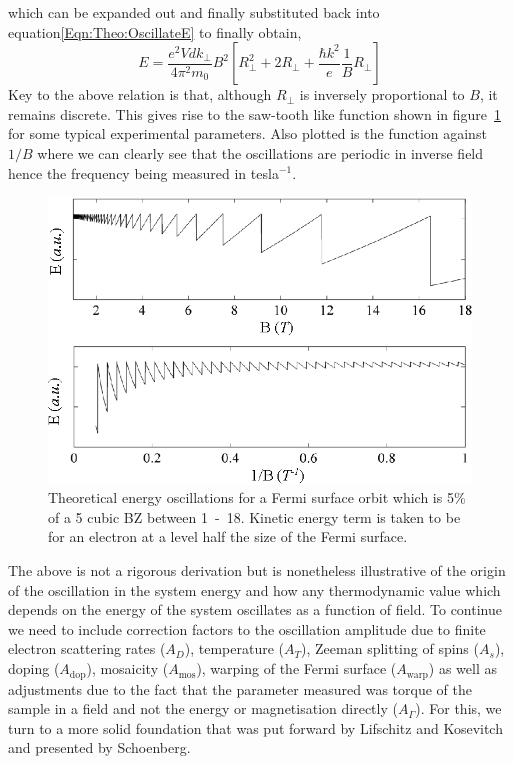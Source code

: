 which can be expanded out and finally substituted back into equation\ref{Eqn:Theo:OscillateE} to finally obtain,
\begin{equation}
\label{Eqn:Theo:OscIllustration}
E = \frac{e^2Vdk_\perp}{4\pi^2m_0}B^2\left[R_\perp^2 + 2R_\perp + \frac{\hbar k^2}{e}\frac{1}{B}R_\perp\right]
\end{equation}
Key to the above relation is that, although $R_\perp$ is inversely proportional to $B$, it remains discrete. This gives rise to the saw-tooth like function shown in figure~\ref{Fig:Theo:EnergyOscillations} for some typical experimental parameters. Also plotted is the function against $1/B$ where we can clearly see that the oscillations are periodic in inverse field hence the frequency being measured in tesla$^{-1}$.
\begin{figure}[htbp]
    \begin{center}
        \includegraphics[scale=0.9]{Chapter-Theory/Figures/TheoreticalOscillations/TheoreticalOscillations}
        \caption{Theoretical energy oscillations for a Fermi surface orbit which is 5\% of a \unit{5}{\angstrom} cubic \ac{BZ} between \unit{1-18}{\tesla}. Kinetic energy term is taken to be for an electron at a level half the size of the Fermi surface.}
        \label{Fig:Theo:EnergyOscillations}
    \end{center}
\end{figure}

The above is not a rigorous derivation but is nonetheless illustrative of the origin of the oscillation in the system energy and how any thermodynamic value which depends on the energy of the system oscillates as a function of field. To continue we need to include correction factors to the oscillation amplitude due to finite electron scattering rates ($A_D$), temperature ($A_T$), Zeeman splitting of spins ($A_s$), doping ($A_{\textrm{dop}}$), mosaicity ($A_{\textrm{mos}}$), warping of the Fermi surface ($A_{\textrm{warp}}$) as well as adjustments due to the fact that the parameter measured was torque of the sample in a field and not the energy or magnetisation directly ($A_{\Gamma}$). For this, we turn to a more solid foundation that was put forward by Lifschitz and Kosevitch and presented by Schoenberg.

